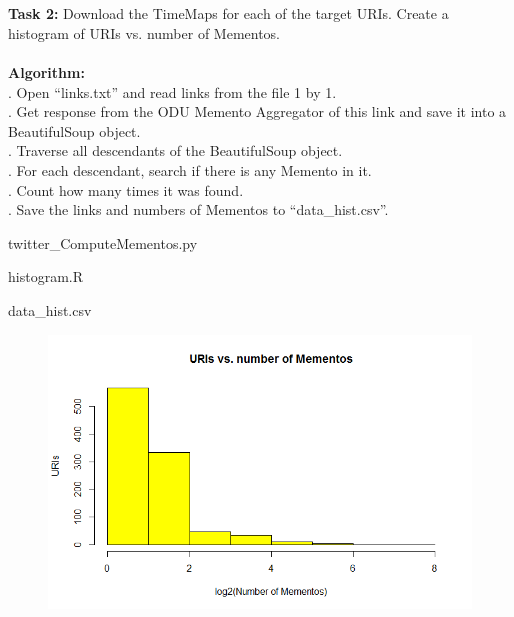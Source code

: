 \documentclass{article}
\begin{document}
		\textbf{\\\\Task 2: }Download the TimeMaps for each of the target URIs. Create a histogram of URIs vs. number of Mementos.\\\\
		\textbf{Algorithm:}\\
		. Open ``links.txt'' and read links from the file 1 by 1.\\
		. Get response from the ODU Memento Aggregator of this link and save it into a BeautifulSoup object.\\
		. Traverse all descendants of the BeautifulSoup object.\\
		. For each descendant, search if there is any Memento in it.\\
		. Count how many times it was found.\\
		. Save the links and numbers of Mementos to ``data\_hist.csv''.
		\begin{list}{\textbf{Source code:}}
			\item twitter\_ComputeMementos.py
		\end{list}
		\begin{list}{\textbf{R code:}}
			\item histogram.R
		\end{list}
		\begin{list}{\textbf{Results:}}
			\item data\_hist.csv
		\end{list}
		\begin{figure}[h]
			\centering 
			\includegraphics[width=1\textwidth]{URIs_vs_Mementos.png}
			\label{fig:hist} 
		\end{figure}
\end{document}
